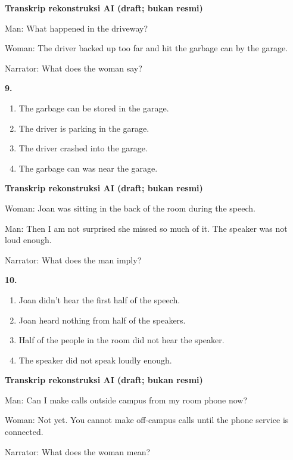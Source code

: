 \documentclass[12pt]{article}
\begin{document}
\par
\vspace{0.25\baselineskip}
\begin{exampleblock}
\textbf{Transkrip rekonstruksi AI (draft; bukan resmi)}\par
Man: What happened in the driveway?\par
Woman: The driver backed up too far and hit the garbage can by the garage.\par
Narrator: What does the woman say?\par
\end{exampleblock}
\noindent\textbf{9.}
\begin{enumerate}[label=(\Alph*),leftmargin=*,itemsep=0.2em]
\item The garbage can be stored in the garage.
\item The driver is parking in the garage.
\item The driver crashed into the garage.
\item The garbage can was near the garage.
\end{enumerate}
\par
\vspace{0.25\baselineskip}
\begin{exampleblock}
\textbf{Transkrip rekonstruksi AI (draft; bukan resmi)}\par
Woman: Joan was sitting in the back of the room during the speech.\par
Man: Then I am not surprised she missed so much of it. The speaker was not loud enough.\par
Narrator: What does the man imply?\par
\end{exampleblock}
\noindent\textbf{10.}
\begin{enumerate}[label=(\Alph*),leftmargin=*,itemsep=0.2em]
\item Joan didn't hear the first half of the speech.
\item Joan heard nothing from half of the speakers.
\item Half of the people in the room did not hear the speaker.
\item The speaker did not speak loudly enough.
\end{enumerate}
\par
\vspace{0.25\baselineskip}
\begin{exampleblock}
\textbf{Transkrip rekonstruksi AI (draft; bukan resmi)}\par
Man: Can I make calls outside campus from my room phone now?\par
Woman: Not yet. You cannot make off-campus calls until the phone service is connected.\par
Narrator: What does the woman mean?\par
\end{exampleblock}
\end{document}
